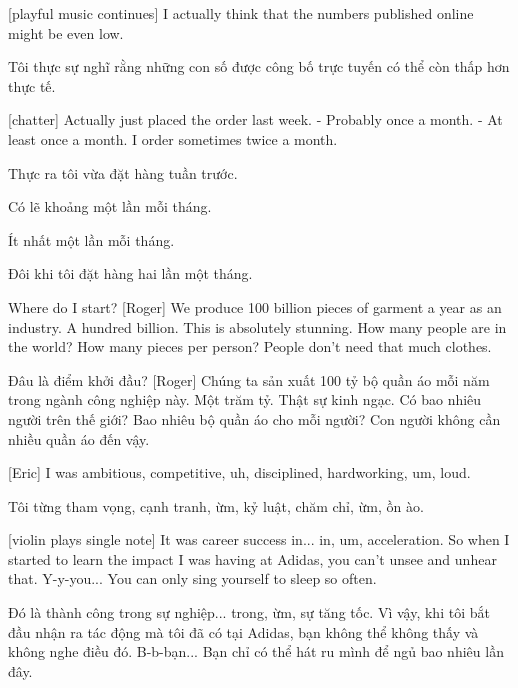 \documentclass[a4paper]{article}
\begin{document}
	
	[playful music continues]
	I actually think that the numbers published online might be even low.
	
	\begin{vietnamese-v2}
		
		Tôi thực sự nghĩ rằng những con số được công bố trực tuyến có thể còn thấp hơn thực tế.
	\end{vietnamese-v2}

	[chatter]
	Actually just placed the order last week.
	- Probably once a month. 
	- At least once a month.
	I order sometimes twice a month.
	
	\begin{vietnamese-v2}
		
		Thực ra tôi vừa đặt hàng tuần trước.
		
		Có lẽ khoảng một lần mỗi tháng.
		
		Ít nhất một lần mỗi tháng.
		
		Đôi khi tôi đặt hàng hai lần một tháng.
	\end{vietnamese-v2}
	
	Where do I start?
	[Roger] We produce 100 billion pieces of garment a year as an industry.
	A hundred billion.
	This is absolutely stunning.
	How many people are in the world?
	How many pieces per person? People don't need that much clothes.
	
	\begin{vietnamese-v2}
		Đâu là điểm khởi đầu? 
		[Roger] Chúng ta sản xuất 100 tỷ bộ quần áo mỗi năm trong ngành công nghiệp này. 
		Một trăm tỷ. 
		Thật sự kinh ngạc. 
		Có bao nhiêu người trên thế giới? Bao nhiêu bộ quần áo cho mỗi người? Con người không cần nhiều quần áo đến vậy.
	\end{vietnamese-v2}

	[Eric] I was ambitious,	competitive, uh, disciplined, hardworking, um, loud.
	
	\begin{vietnamese-v2}
		[Eric] Tôi từng tham vọng, cạnh tranh, ừm, kỷ luật, chăm chỉ, ừm, ồn ào.
	\end{vietnamese-v2}

	[violin plays single note]
	It was career success in... in, um, acceleration. So when I started to learn the impact I was having at Adidas, you can't unsee and unhear that.
	Y-y-you... You can only sing yourself to sleep so often.
	
	\begin{vietnamese-v2}
		Đó là thành công trong sự nghiệp... trong, ừm, sự tăng tốc. 
		Vì vậy, khi tôi bắt đầu nhận ra tác động mà tôi đã có tại Adidas, bạn không thể không thấy và không nghe điều đó.
		B-b-bạn... Bạn chỉ có thể hát ru mình để ngủ bao nhiêu lần đây.
	\end{vietnamese-v2}
	
\end{document}
